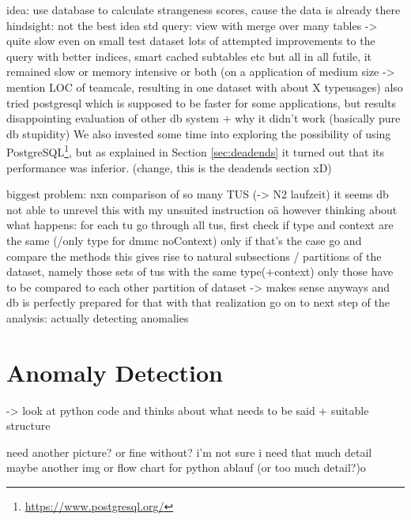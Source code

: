 
idea: use database to calculate strangeness scores, cause the data is already there
hindsight: not the best idea
std query: view with merge over many tables -> quite slow even on small test dataset
lots of attempted improvements to the query with better indices, smart cached subtables etc
but all in all futile, it remained slow or memory intensive or both (on a application of medium size -> mention LOC of teamcale, resulting in one dataset with about X typeusages)
also tried postgresql which is supposed to be faster for some applications, but results disappointing
evaluation of other db system + why it didn't work (basically pure db stupidity)
We also invested some time into exploring the possibility of using PostgreSQL\footnote{\url{https://www.postgresql.org/}}, but as explained in Section \ref{sec:deadends} it turned out that its performance was inferior. (change, this is the deadends section xD)

biggest problem: nxn comparison of so many TUS (-> N2 laufzeit)
it seems db not able to unrevel this with my unsuited instruction oä
however thinking about what happens:
for each tu go through all tus, first check if type and context are the same (/only type for dmmc noContext)
only if that's the case go and compare the methods
this gives rise to natural subsections / partitions of the dataset, namely those sets of tus with the same type(+context)
only those have to be compared to each other
partition of dataset -> makes sense anyways and db is perfectly prepared for that
with that realization go on to next step of the analysis: actually detecting anomalies

\section{Anomaly Detection}\label{sec:anomaly}

-> look at python code and thinks about what needs to be said + suitable structure

need another picture? or fine without? i'm not sure i need that much detail\ldotsw
maybe another img or flow chart for python ablauf (or too much detail?)o

